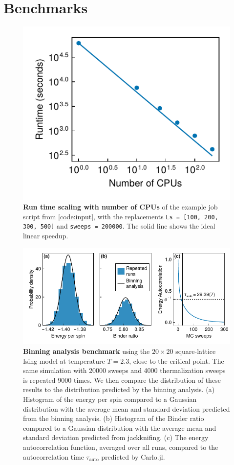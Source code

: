 \documentclass{SciPost}
\begin{document}
\section{Benchmarks}
\label{sec:benchmarks}
\begin{figure}
\begin{center}
\includegraphics{figs/scaling.pdf}
\end{center}
\caption{\textbf{Run time scaling with number of CPUs} of the example job script from \cref{code:input}, with the replacements \texttt{Ls = [100, 200, 300, 500]} and \texttt{sweeps = 200000}. The solid line shows the ideal linear speedup.}
\label{fig:benchmark}
\end{figure}
\begin{figure}
\begin{center}
\includegraphics{figs/stats.pdf}
\end{center}
\caption{\textbf{Binning analysis benchmark} using the $20\times 20$ square-lattice Ising model at temperature $T=2.3$, close to the critical point. The same simulation with 20000 sweeps and 4000 thermalization sweeps is repeated 9000 times. We then compare the distribution of these results to the distribution predicted by the binning analysis. (a) Histogram of the energy per spin compared to a Gaussian distribution with the average mean and standard deviation predicted from the binning analysis. (b) Histogram of the Binder ratio compared to a Gaussian distribution with the average mean and standard deviation predicted from jackknifing. (c) The energy autocorrelation function, averaged over all runs, compared to the autocorrelation time $\tau_\text{auto}$ predicted by Carlo.jl.}
\label{fig:statistics}
\end{figure}
\end{document}
